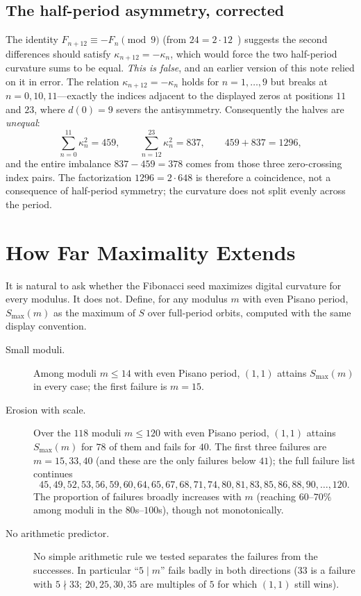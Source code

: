 \documentclass[12pt]{article}
\theoremstyle{remark}
\begin{document}
\subsection{The half-period asymmetry, corrected}\label{sec:halves}

The identity $F_{n+12}\equiv -F_n\pmod 9$ (from $24=2\cdot 12$~\cite{Wall1960}) suggests
the second differences should satisfy $\kappa_{n+12}=-\kappa_n$, which would force the two
half-period curvature sums to be equal. \emph{This is false}, and an earlier version of
this note relied on it in error. The relation $\kappa_{n+12}=-\kappa_n$ holds for
$n=1,\dots,9$ but breaks at $n=0,10,11$---exactly the indices adjacent to the displayed
zeros at positions $11$ and $23$, where $d(0)=9$ severs the antisymmetry. Consequently the
halves are \emph{unequal}:
\[
\sum_{n=0}^{11}\kappa_n^2=459,\qquad \sum_{n=12}^{23}\kappa_n^2=837,\qquad 459+837=1296,
\]
and the entire imbalance $837-459=378$ comes from those three zero-crossing index pairs.
The factorization $1296=2\cdot 648$ is therefore a coincidence, not a consequence of
half-period symmetry; the curvature does not split evenly across the period.

\section{How Far Maximality Extends}\label{sec:maximality}

It is natural to ask whether the Fibonacci seed maximizes digital curvature for every
modulus. It does not. Define, for any modulus $m$ with even Pisano period, $S_{\max}(m)$ as
the maximum of $S$ over full-period orbits, computed with the same display convention.

\begin{description}
\item[Small moduli.] Among moduli $m\le 14$ with even Pisano period, $(1,1)$ attains
$S_{\max}(m)$ in every case; the first failure is $m=15$.
\item[Erosion with scale.] Over the $118$ moduli $m\le 120$ with even Pisano period,
$(1,1)$ attains $S_{\max}(m)$ for $78$ of them and fails for $40$. The first three failures
are $m=15,33,40$ (and these are the only failures below $41$); the full failure list
continues
\[
45,49,52,53,56,59,60,64,65,67,68,71,74,80,81,83,85,86,88,90,\dots,120 .
\]
The proportion of failures broadly increases with $m$ (reaching $60$--$70\%$ among moduli
in the $80$s--$100$s), though not monotonically.
\item[No arithmetic predictor.] No simple arithmetic rule we tested separates the failures
from the successes. In particular ``$5\mid m$'' fails badly in both directions ($33$ is a
failure with $5\nmid 33$; $20,25,30,35$ are multiples of $5$ for which $(1,1)$ still wins).
\end{description}
\end{document}
